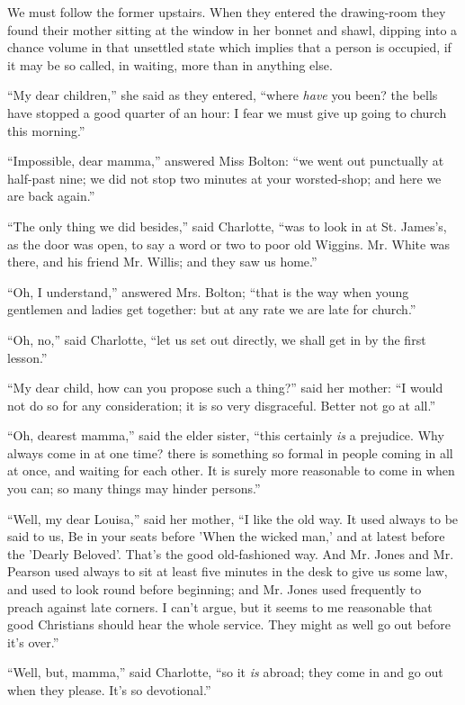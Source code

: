 We must follow the former upstairs. When they entered the
drawing-room they found their mother sitting at the window in her
bonnet and shawl, dipping into a chance volume in that unsettled
state which implies that a person is occupied, if it may be so called,
in waiting, more than in anything else.

``My dear children,'' she said as they entered, ``where
\emph{have} you been? the bells have stopped a good quarter of an hour: I
fear we must give up going to church this morning.''

``Impossible, dear mamma,'' answered Miss Bolton: ``we
went out punctually at half-past nine; we did not stop two minutes at
your worsted-shop; and here we are back again.''

``The only thing we did besides,'' said Charlotte,
``was to look in at St. James's, as the door was open, to say a
word or two to poor old Wiggins. Mr. White was there, and his friend
Mr. Willis; and they saw us home.''

``Oh, I understand,'' answered Mrs. Bolton; ``that is
the way when young gentlemen and ladies get together: but at any rate
we are late for church.''

``Oh, no,'' said Charlotte, ``let us set out directly,
we shall get in by the first lesson.''

``My dear child, how can you propose such a thing?'' said
her mother: ``I would not do so for any consideration; it is so
very disgraceful. Better not go at all.''

``Oh, dearest mamma,'' said the elder sister, ``this
certainly \emph{is} a prejudice. Why always come in at one time? there
is something so formal in people coming in all at once, and waiting
for each other. It is surely more reasonable to come in when you can;
so many things may hinder persons.''

``Well, my dear Louisa,'' said her mother, ``I like the
old way. It used always to be said to us, Be in your seats before
'When the wicked man,' and at latest before the 'Dearly Beloved'. That's
the good old-fashioned way. And Mr. Jones and Mr. Pearson used always
to sit at least five minutes in the desk to give us some law, and used
to look round before beginning; and Mr. Jones used frequently to
preach against late corners. I can't argue, but it seems to me
reasonable that good Christians should hear the whole service. They
might as well go out before it's over.''

``Well, but, mamma,'' said Charlotte, ``so it \emph{is}
abroad; they come in and go out when they please. It's so
devotional.''

